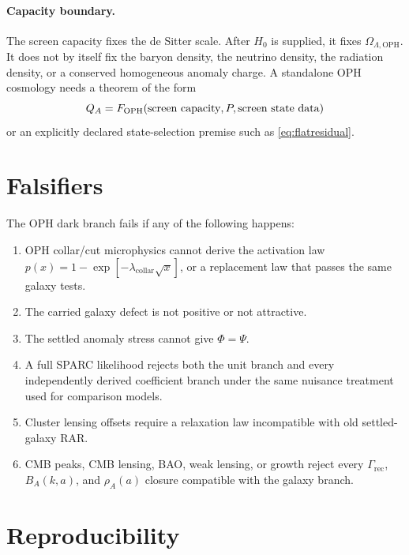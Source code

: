 \documentclass[11pt]{article}
\newcommand{\OPH}{\mathrm{OPH}}
\newcommand{\lambdac}{\lambda_{\mathrm{collar}}}
\begin{document}
\paragraph{Capacity boundary.}
The screen capacity fixes the de Sitter scale.  After \(H_0\) is supplied, it
fixes \(\Omega_{\Lambda,\OPH}\).  It does not by itself fix the baryon density,
the neutrino density, the radiation density, or a conserved homogeneous
anomaly charge.  A standalone OPH cosmology needs a theorem of the form
\[
  Q_A=F_{\OPH}(\hbox{screen capacity},P,\hbox{screen state data})
\]
or an explicitly declared state-selection premise such as
\eqref{eq:flatresidual}.

\section{Falsifiers}

The OPH dark branch fails if any of the following happens:
\begin{enumerate}
\item OPH collar/cut microphysics cannot derive the activation law
\(p(x)=1-\exp[-\lambdac\sqrt{x}]\), or a replacement law that passes the same
galaxy tests.
\item The carried galaxy defect is not positive or not attractive.
\item The settled anomaly stress cannot give \(\Phi=\Psi\).
\item A full SPARC likelihood rejects both the unit branch and every
independently derived coefficient branch under the same nuisance treatment used
for comparison models.
\item Cluster lensing offsets require a relaxation law incompatible with old
settled-galaxy RAR.
\item CMB peaks, CMB lensing, BAO, weak lensing, or growth reject every
\(\Gamma_{\mathrm{rec}}\), \(B_A(k,a)\), and \(\rho_A(a)\) closure compatible
with the galaxy branch.
\end{enumerate}

\section{Reproducibility}
\end{document}
